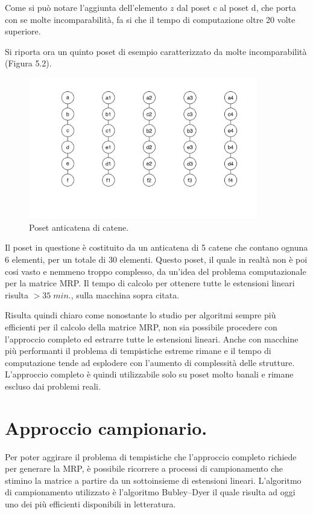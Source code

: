 \documentclass{report}
\begin{document}
Come si può notare l'aggiunta dell'elemento $z$ dal poset c al poset d, che porta con se molte incomparabilità, fa si che il tempo di computazione oltre 20 volte superiore.


Si riporta ora un quinto poset di esempio caratterizzato da molte incomparabilità (Figura 5.2).
\begin{figure}[H]
    \centering
    \includegraphics[width=10cm]{IMAGES/poset_13.png}
    \caption{Poset anticatena di catene.}
    \label{fig:roc}
\end{figure}

Il poset in questione è costituito da un anticatena di 5 catene che contano ognuna 6 elementi, per un totale di 30 elementi.
Questo poset, il quale in realtà non è poi cosi vasto e nemmeno troppo complesso, da un'idea del problema computazionale per la matrice MRP.
Il tempo di calcolo per ottenere tutte le estensioni lineari risulta $> 35 \;min.$, sulla macchina sopra citata.


Risulta quindi chiaro come nonostante lo studio per algoritmi sempre più efficienti per il calcolo della matrice MRP, non sia possibile procedere con l'approccio completo ed estrarre tutte le estensioni lineari. Anche con macchine più performanti il problema di tempistiche estreme rimane e il tempo di computazione tende ad esplodere con l'aumento di complessità delle strutture. L'approccio completo è quindi utilizzabile solo su poset molto banali e rimane escluso dai problemi reali. 

\section{Approccio campionario.}
Per poter aggirare il problema di tempistiche che l'approccio completo richiede per generare la MRP, è possibile ricorrere a processi di campionamento che stimino la matrice a partire da un sottoinsieme di estensioni lineari. L'algoritmo di campionamento utilizzato è l'algoritmo Bubley–Dyer \citep{bubley} il quale risulta ad oggi uno dei più efficienti disponibili in letteratura.
\end{document}
